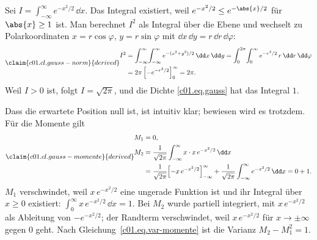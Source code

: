 \begin{vertiefung}[id=c01.v3,
    titel={Normierung und Momente der Gauß-Verteilung},
    wozu={Beispiel~\ref{c01.ex.gauss} behauptet, die Gauß-Dichte sei normiert. Hier wird
      das nachgerechnet, zusammen mit Mittelwert und Varianz.},
    voraussetzung={Abschnitt~\ref{c01.s4}; Integrale in zwei Variablen, Polarkoordinaten,
      partielle Integration. Der Kern benutzt nur das Ergebnis.},
    zurueck={Die Gauß-Dichte $e^{-x^2/2}/\sqrt{2\pi}$ ist normiert, ihr Mittelwert ist $0$
      und ihre Varianz $1$.}]
  Sei $I = \int_{-\infty}^{\infty} e^{-x^2/2}\,\dd x$. Das Integral existiert, weil
  $e^{-x^2/2} \leq e^{-\abs{x}/2}$ für $\abs{x} \geq 1$ ist. Man berechnet $I^2$ als
  Integral über die Ebene und wechselt zu Polarkoordinaten $x = r\cos\varphi$,
  $y = r\sin\varphi$ mit $\dd x\,\dd y = r\,\dd r\,\dd\varphi$:
  \begin{equation}\label{c01.eq.gauss-norm}\claim{c01.cl.gauss-norm}{derived}
    \begin{aligned}
      I^2 &= \int_{-\infty}^{\infty}\!\int_{-\infty}^{\infty} e^{-(x^2 + y^2)/2}\,\dd x\,\dd y
           = \int_0^{2\pi}\!\int_0^\infty e^{-r^2/2}\, r\,\dd r\,\dd\varphi \\
          &= 2\pi\,\Bigl[-e^{-r^2/2}\Bigr]_0^\infty = 2\pi .
    \end{aligned}
  \end{equation}
  Weil $I > 0$ ist, folgt $I = \sqrt{2\pi}$, und die Dichte \eqref{c01.eq.gauss} hat das
  Integral $1$.

  Dass die erwartete Position null ist, ist intuitiv klar; bewiesen wird es trotzdem. Für die
  Momente gilt
  \begin{equation}\label{c01.eq.gauss-momente}\claim{c01.cl.gauss-momente}{derived}
    \begin{aligned}
      M_1 &= 0, \\
      M_2 &= \frac{1}{\sqrt{2\pi}}\int_{-\infty}^{\infty} x\cdot x\,e^{-x^2/2}\,\dd x \\
          &= \frac{1}{\sqrt{2\pi}}\Bigl[-x\,e^{-x^2/2}\Bigr]_{-\infty}^{\infty}
            + \frac{1}{\sqrt{2\pi}}\int_{-\infty}^{\infty} e^{-x^2/2}\,\dd x
          = 0 + 1 .
    \end{aligned}
  \end{equation}
  $M_1$ verschwindet, weil $x\,e^{-x^2/2}$ eine ungerade Funktion ist und ihr Integral
  über $x \geq 0$ existiert: $\int_0^\infty x\,e^{-x^2/2}\,\dd x = 1$. Bei $M_2$ wurde
  partiell integriert, mit $x\,e^{-x^2/2}$ als Ableitung von $-e^{-x^2/2}$; der Randterm
  verschwindet, weil $x\,e^{-x^2/2}$ für $x \to \pm\infty$ gegen $0$ geht. Nach
  Gleichung~\eqref{c01.eq.var-momente} ist die Varianz $M_2 - M_1^2 = 1$.
\end{vertiefung}

